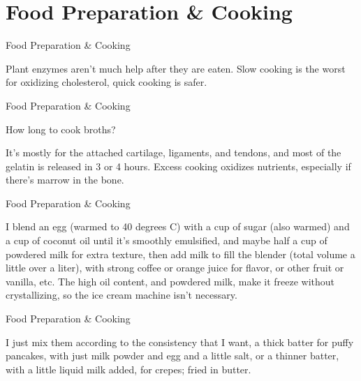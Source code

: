 \documentclass[11pt,oneside,openany,extrafontsizes]{memoir}
\begin{document}
\section{Food Preparation \& Cooking}

\begin{standalonequote}{Food Preparation \& Cooking}

    \begin{answer}
        Plant enzymes aren't much help after they are eaten. Slow cooking is the worst for oxidizing cholesterol, quick cooking is safer.
    \end{answer}
\end{standalonequote}

\begin{qaexchange}{Food Preparation \& Cooking}

    \begin{question}
        How long to cook broths?
    \end{question}

    \begin{answer}
        It's mostly for the attached cartilage, ligaments, and tendons, and most of the gelatin is released in 3 or 4 hours. Excess cooking oxidizes nutrients, especially if there's marrow in the bone.
    \end{answer}
\end{qaexchange}

\begin{standalonequote}{Food Preparation \& Cooking}

    \begin{answer}
        I blend an egg (warmed to 40 degrees C) with a cup of sugar (also warmed) and a cup of coconut oil until it's smoothly emulsified, and maybe half a cup of powdered milk for extra texture, then add milk to fill the blender (total volume a little over a liter), with strong coffee or orange juice for flavor, or other fruit or vanilla, etc. The high oil content, and powdered milk, make it freeze without crystallizing, so the ice cream machine isn't necessary.
    \end{answer}
\end{standalonequote}

\begin{standalonequote}{Food Preparation \& Cooking}

    \begin{answer}
       I just mix them according to the consistency that I want, a thick batter for puffy pancakes, with just milk powder and egg and a little salt, or a thinner batter, with a little liquid milk added, for crepes; fried in butter. 
    \end{answer}
\end{standalonequote}
\end{document}
